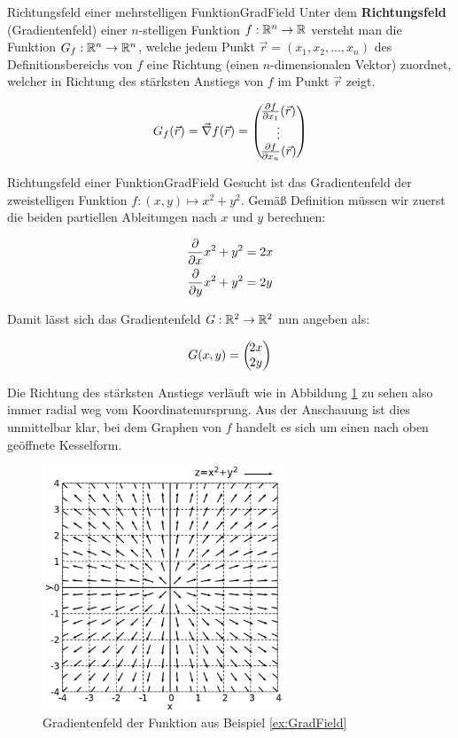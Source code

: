 \begin{definition}{Richtungsfeld einer mehrstelligen Funktion}{GradField}
    Unter dem \textbf{Richtungsfeld} (Gradientenfeld) einer $n$-stelligen Funktion $f: \mathbb{R}^n \to  \mathbb{R}$ versteht man die Funktion $G_f: \mathbb{R}^n \to \mathbb{R}^n$, welche jedem Punkt $\vec{r}=(x_1,x_2,...,x_n)$ des Definitionsbereichs von $f$ eine Richtung (einen $n$-dimensionalen Vektor) zuordnet, welcher in Richtung des stärksten Anstiegs von $f$ im Punkt $\vec{r}$ zeigt.

    $$
        G_f(\vec{r}) = \vec\nabla f(\vec{r}) = \left(\negthinspace\begin{matrix}\frac{\partial f}{\partial x_1}(\vec{r})\\\vdots\\\frac{\partial f}{\partial x_n}(\vec{r})\end{matrix}\right)
    $$
\end{definition}

\begin{example}{Richtungsfeld einer Funktion}{GradField}
    Gesucht ist das Gradientenfeld der zweistelligen Funktion $f: (x,y) \mapsto x^2+y^2$. Gemäß Definition müssen wir zuerst die beiden partiellen Ableitungen nach $x$ und $y$ berechnen:

    \begin{alignat*}{1}
        \frac{\partial }{\partial x} x^2+y^2 &= 2x \\
        \frac{\partial }{\partial y} x^2+y^2 &= 2y
    \end{alignat*}

    Damit lässt sich das Gradientenfeld $G: \mathbb{R}^2 \to \mathbb{R}^2$ nun angeben als:

    $$
        G(x,y) = \left(\negthinspace\begin{matrix}2x\\2y\end{matrix}\right)
    $$

    Die Richtung des stärksten Anstiegs verläuft wie in Abbildung \ref{fig:ExGradField} zu sehen also immer radial weg vom Koordinatenursprung. Aus der Anschauung ist dies unmittelbar klar, bei dem Graphen von $f$ handelt es sich um einen nach oben geöffnete Kesselform.
\end{example}

\begin{figure}
    \centering
    \includegraphics[width=0.65\textwidth]{./gnuplot/example-gradient-field}
    \caption[Gradientenfeld einer zweistelligen Funktion]{Gradientenfeld der Funktion aus Beispiel \ref{ex:GradField}}
    \label{fig:ExGradField}
\end{figure}

